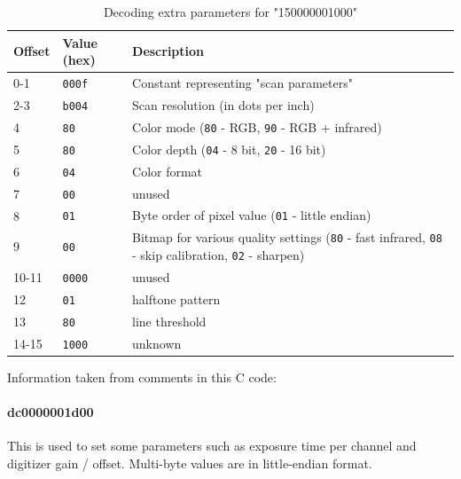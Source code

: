 \documentclass{article}
\begin{document}
\begin{table}[H]
  \caption{Decoding extra parameters for "150000001000"}
  \centering
  \begin{tabular}{p{1cm} | p{1cm} | p{7cm}}
    Offset & Value (hex) & Description \\ \hline
    0-1 & {\tt 000f} & Constant representing "scan parameters" \\
    2-3 & {\tt b004} & Scan resolution (in dots per inch) \\
    4 & {\tt 80} & Color mode ({\tt 80} - RGB, {\tt 90} - RGB + infrared) \\
    5 & {\tt 80} & Color depth ({\tt 04} - 8 bit, {\tt 20} - 16 bit) \\
    6 & {\tt 04} & Color format \\
    7 & {\tt 00} & unused \\
    8 & {\tt 01} & Byte order of pixel value ({\tt 01} - little endian) \\
    9 & {\tt 00} & Bitmap for various quality settings ({\tt 80} - fast infrared,
                                                        {\tt 08} - skip calibration,
                                                        {\tt 02} - sharpen) \\
    10-11 & {\tt 0000} & unused \\
    12 & {\tt 01} & halftone pattern \\
    13 & {\tt 80} & line threshold \\
    14-15 & {\tt 1000} & unknown \\
  \end{tabular}
  
  \vspace{5mm}
  Information taken from comments in this C code: \cite[\texttt{pieusb\_scancmd.c}]{sane_code}
  \label{table:param15}
\end{table}

\paragraph{dc0000001d00} This is used to set some parameters such as exposure time
per channel and digitizer gain / offset. Multi-byte
values are in little-endian format.
\end{document}

